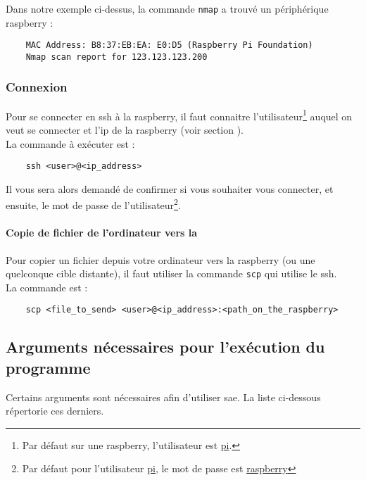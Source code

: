 Dans notre exemple ci-dessus, la commande \texttt{nmap} a trouvé un périphérique \gls{raspberry} :

\begin{verbatim}
    MAC Address: B8:37:EB:EA: E0:D5 (Raspberry Pi Foundation)
    Nmap scan report for 123.123.123.200
\end{verbatim}

\subsubsection{Connexion}

Pour se connecter en \gls{ssh} à la \gls{raspberry}, il faut connaitre l'utilisateur\footnote{Par défaut sur une
    \gls{raspberry}, l'utilisateur est \underline{pi}.} auquel on veut se connecter et l'\gls{ip} de la \gls{raspberry}
(voir section ).\\
La commande à exécuter est :

\begin{verbatim}
    ssh <user>@<ip_address>
\end{verbatim}

Il vous sera alors demandé de confirmer si vous souhaiter vous connecter, et ensuite, le mot de passe de
l'utilisateur\footnote{Par défaut pour l'utilisateur \underline{pi}, le mot de passe est \underline{raspberry}}.

\paragraph{Copie de fichier de l'ordinateur vers la }
\label{sec:copieVersRaspberry}

Pour copier un fichier depuis votre ordinateur vers la \gls{raspberry} (ou une quelconque cible distante), il faut
utiliser la commande \texttt{scp} qui utilise le \gls{ssh}.\\
La commande est :

\begin{verbatim}
    scp <file_to_send> <user>@<ip_address>:<path_on_the_raspberry>
\end{verbatim}

\subsection{Arguments nécessaires pour l'exécution du programme}
\label{sec:executionArg_clearWay}
Certains arguments sont nécessaires afin d'utiliser \gls{sae}. La liste ci-dessous répertorie ces derniers.

